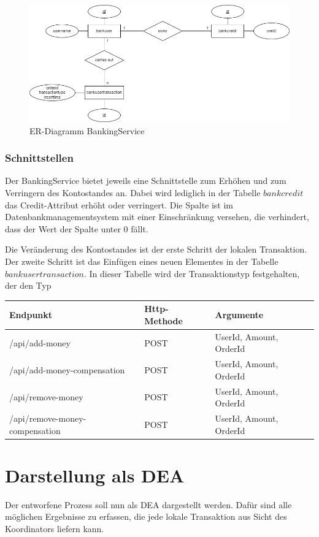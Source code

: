 \begin{figure}[h!]
	\centering
	\includegraphics[scale=0.5]{figures/DatabaseER/BankingServiceTables.png}
	\caption{ER-Diagramm BankingService}
\end{figure}
\FloatBarrier

\subsubsection{Schnittstellen}
Der BankingService bietet jeweils eine Schnittstelle zum Erhöhen und zum Verringern des Kontostandes an. Dabei wird lediglich in der Tabelle $bankcredit$ das Credit-Attribut erhöht oder verringert. Die Spalte ist im Datenbankmanagementsystem mit einer Einschränkung versehen, die verhindert, dass der Wert der Spalte unter 0 fällt. 

Die Veränderung des Kontostandes ist der erste Schritt der lokalen Transaktion. Der zweite Schritt ist das Einfügen eines neuen Elementes in der Tabelle $bankusertransaction$. In dieser Tabelle wird der Transaktionstyp festgehalten, der den Typ

\begin{center}
	\begin{tabular}[h]{|l|l|l|}
		\hline
		Endpunkt & Http-Methode & Argumente \\ \hline
		/api/add-money & POST & UserId, Amount, OrderId \\ \hline
		/api/add-money-compensation & POST & UserId, Amount, OrderId \\ \hline
		/api/remove-money & POST & UserId, Amount, OrderId \\ \hline
		/api/remove-money-compensation & POST & UserId, Amount, OrderId \\ \hline 
	\end{tabular}
\end{center}
\FloatBarrier

\section{Darstellung als DEA}
Der entworfene Prozess soll nun als DEA dargestellt werden. Dafür sind alle möglichen Ergebnisse zu erfassen, die jede lokale Transaktion aus Sicht des Koordinators liefern kann. 


